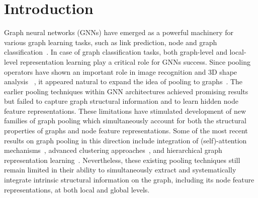 \documentclass[letterpaper]{article} %
\begin{document}
\section{Introduction}
Graph neural networks (GNNs) have emerged as a powerful machinery for various graph learning tasks,
such as link prediction, node and graph classification~\cite{zhou2020graph, xia2021graph}.
In case of graph classification tasks, both graph-level and local-level %
representation learning play a critical role for GNNs success. Since pooling operators have shown an important role in image recognition and 3D shape analysis%
~\cite{boureau2010theoretical,shen2018mining}, it appeared natural to expand the idea of pooling to graphs~\cite{yu2016multi,defferrard2016convolutional}. The earlier pooling techniques within GNN architectures achieved promising results but failed to capture graph structural information and to learn hidden node feature representations. These limitations have stimulated development of new families of graph pooling which simultaneously
account for both the structural properties of graphs and node feature representations. Some of the most recent results on graph pooling in this direction include integration of (self)-attention mechanisms~\cite{huang2019attpool,lee2019self}, advanced clustering approaches~\cite{bianchi2020spectral,wang2020haar,bodnar2021deep}, and hierarchical graph representation learning~\cite{yang2021hierarchical}.
Nevertheless, these existing pooling techniques still remain limited in their ability to simultaneously extract and systematically integrate intrinsic structural information on the graph, including its node feature representations, at both local and global levels.
\end{document}
